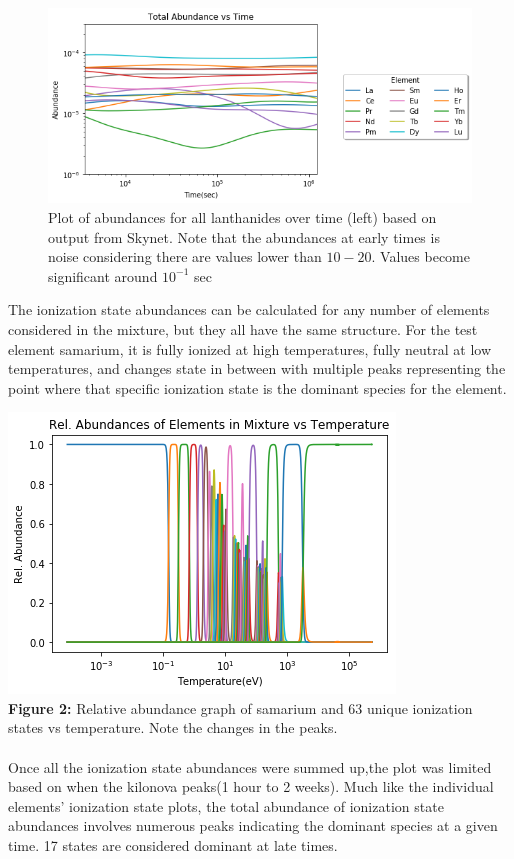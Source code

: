 \documentclass[11pt,a4paper]{article}
\begin{document}
\begin{figure}[h!]
  \includegraphics[width=1\textwidth]{elemental.png}
  \caption{Plot of abundances for all lanthanides over time (left) based on output from Skynet. Note that the abundances at early times is noise considering there are values lower than $10-20$. Values become significant around $10^{-1}$ sec}
\end{figure} 

The ionization state abundances can be calculated for any number of elements considered in the mixture, but they all have the same structure. For the test element samarium, it is fully ionized at high temperatures, fully neutral at low temperatures, and changes state in between with multiple peaks representing the point where that specific ionization state is the dominant species for the element.  

\includegraphics[width=.75\textwidth]{samarium.png}\\
\scriptsize{\textbf{Figure 2:} Relative abundance graph of samarium and 63 unique ionization states vs temperature. Note the changes in the peaks.}\\\\
\normalsize Once all the ionization state abundances were summed up,the plot was limited based on when the kilonova peaks(1 hour to 2 weeks). Much like the individual elements' ionization state plots, the total abundance of ionization state abundances involves numerous peaks indicating the dominant species at a given time. 17 states are considered dominant at late times.
\end{document}
